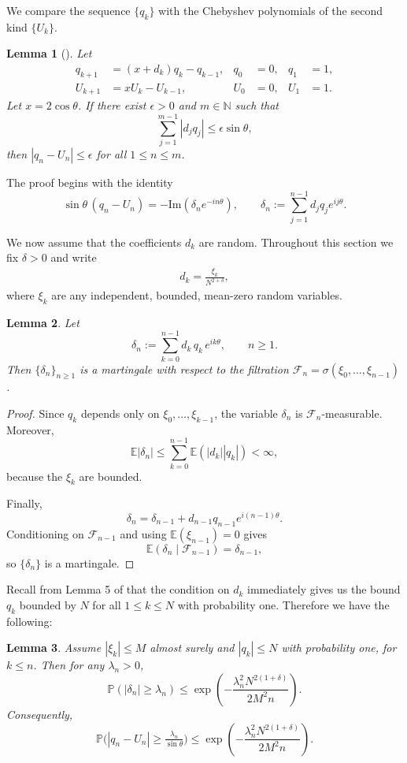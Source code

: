 \documentclass{amsart}
\newtheorem{lemma}{Lemma}
\theoremstyle{remark}
\theoremstyle{definition}
\begin{document}
We compare the sequence $\{q_k\}$ with the Chebyshev polynomials of the second kind $\{U_k\}$.

\begin{lemma}[{\cite[Lemma~4]{Viv20}}]
Let
\begin{align*}
q_{k+1}&=(x+d_k)q_k-q_{k-1}, & q_0&=0, & q_1&=1,\\
U_{k+1}&=xU_k-U_{k-1}, & U_0&=0, & U_1&=1.
\end{align*}
Let $x=2\cos\theta$.  
If there exist $\epsilon>0$ and $m\in\mathbb{N}$ such that
\[
\sum_{j=1}^{m-1}|d_j q_j|\le \epsilon\sin\theta,
\]
then $|q_n-U_n|\le \epsilon$ for all $1\le n\le m$.
\end{lemma}

The proof begins with the identity
\[
\sin\theta\,(q_n-U_n)=-\textrm{Im}\left(\delta_n e^{-in\theta}\right),
\qquad
\delta_n:=\sum_{j=1}^{n-1} d_j q_j e^{ij\theta}.
\]

We now assume that the coefficients $d_k$ are random.  
Throughout this section we fix $\delta>0$ and write
\begin{align}\label{randomerror}
d_k=\frac{\xi_k}{N^{2+\delta}},  
\end{align}
where $\xi_k$ are any independent, bounded, mean-zero random variables.

\begin{lemma}\label{lem:martingale}
Let
\[
\delta_n:=\sum_{k=0}^{n-1} d_k\,q_k\,e^{ik\theta}, \qquad n\ge1.
\]
Then $\{\delta_n\}_{n\ge1}$ is a martingale with respect to the filtration
$\mathcal{F}_n=\sigma(\xi_0,\dots,\xi_{n-1})$.
\end{lemma}

\begin{proof}
Since $q_k$ depends only on $\xi_0,\dots,\xi_{k-1}$, the variable $\delta_n$ is $\mathcal{F}_n$-measurable.
Moreover,
\[
\mathbb{E}|\delta_n|
\le \sum_{k=0}^{n-1}\mathbb{E}(|d_k||q_k|)<\infty,
\]
because the $\xi_k$ are bounded.

Finally,
\[
\delta_n=\delta_{n-1}+d_{n-1}q_{n-1}e^{i(n-1)\theta}.
\]
Conditioning on $\mathcal{F}_{n-1}$ and using $\mathbb{E}(\xi_{n-1})=0$ gives
\[
\mathbb{E}(\delta_n\mid\mathcal{F}_{n-1})=\delta_{n-1},
\]
so $\{\delta_n\}$ is a martingale.
\end{proof}

Recall from Lemma 5 of \cite{Viv20} that the condition on $d_k$ immediately gives us the bound $q_k$ bounded by $N$ for all $1\leq k \leq N$ with probability one. Therefore we have the following:

\begin{lemma}\label{lem:applyAzuma}
Assume $|\xi_k|\le M$ almost surely and $|q_k|\le N$ with probability one, for $k\le n$.  
Then for any $\lambda_n>0$,
\[
\mathbb{P}(|\delta_n|\ge\lambda_n)
\le
\exp\!\left(-\frac{\lambda_n^2 N^{2(1+\delta)}}{2M^2 n}\right).
\]
Consequently,
\[
\mathbb{P}\bigl(|q_n-U_n|\ge \tfrac{\lambda_n}{\sin\theta}\bigr)
\le
\exp\!\left(-\frac{\lambda_n^2 N^{2(1+\delta)}}{2M^2 n}\right).
\]
\end{lemma}
\end{document}
